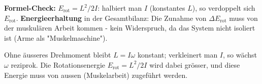 \begin{kontrolle}
\textbf{Formel-Check:} $E_\mathrm{rot}=L^2/2I$: halbiert man $I$ (konstantes
$L$), so verdoppelt sich $E_\mathrm{rot}$. \checkmark
\textbf{Energieerhaltung} in der Gesamtbilanz: Die Zunahme von $\Delta
E_\mathrm{rot}$ muss von der muskulären Arbeit kommen - kein Widerspruch,
da das System nicht isoliert ist (Arme als "Muskelmaschine").
\end{kontrolle}

\begin{merksatz}
Ohne äusseres Drehmoment bleibt $L=I\omega$ konstant; verkleinert man $I$, so
wächst $\omega$ reziprok. Die Rotationsenergie $E_\mathrm{rot}=L^2/2I$ wird
dabei grösser, und diese Energie muss von aussen (Muskelarbeit) zugeführt
werden.
\end{merksatz}